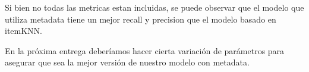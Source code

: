 \documentclass[11pt]{article}
\begin{document}
Si bien no todas las metricas estan incluidas, se puede observar que el modelo que utiliza metadata tiene un mejor recall y precision que el modelo basado en itemKNN.

En la próxima entrega deberíamos hacer cierta variación de parámetros para asegurar que sea la mejor versión de nuestro modelo con metadata.

\end{document}
